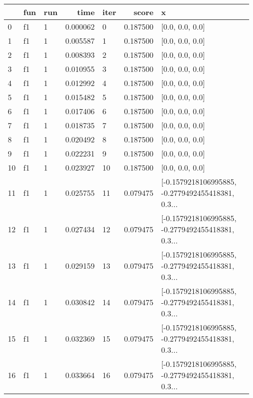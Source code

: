 \begin{tabular}{lllrlrl}
\toprule
{} & fun & run &      time & iter &     score &                                                  x \\
\midrule
0   &  f1 &   1 &  0.000062 &    0 &  0.187500 &                                    [0.0, 0.0, 0.0] \\
1   &  f1 &   1 &  0.005587 &    1 &  0.187500 &                                    [0.0, 0.0, 0.0] \\
2   &  f1 &   1 &  0.008393 &    2 &  0.187500 &                                    [0.0, 0.0, 0.0] \\
3   &  f1 &   1 &  0.010955 &    3 &  0.187500 &                                    [0.0, 0.0, 0.0] \\
4   &  f1 &   1 &  0.012992 &    4 &  0.187500 &                                    [0.0, 0.0, 0.0] \\
5   &  f1 &   1 &  0.015482 &    5 &  0.187500 &                                    [0.0, 0.0, 0.0] \\
6   &  f1 &   1 &  0.017406 &    6 &  0.187500 &                                    [0.0, 0.0, 0.0] \\
7   &  f1 &   1 &  0.018735 &    7 &  0.187500 &                                    [0.0, 0.0, 0.0] \\
8   &  f1 &   1 &  0.020492 &    8 &  0.187500 &                                    [0.0, 0.0, 0.0] \\
9   &  f1 &   1 &  0.022231 &    9 &  0.187500 &                                    [0.0, 0.0, 0.0] \\
10  &  f1 &   1 &  0.023927 &   10 &  0.187500 &                                    [0.0, 0.0, 0.0] \\
11  &  f1 &   1 &  0.025755 &   11 &  0.079475 &  [-0.1579218106995885, -0.2779492455418381, 0.3... \\
12  &  f1 &   1 &  0.027434 &   12 &  0.079475 &  [-0.1579218106995885, -0.2779492455418381, 0.3... \\
13  &  f1 &   1 &  0.029159 &   13 &  0.079475 &  [-0.1579218106995885, -0.2779492455418381, 0.3... \\
14  &  f1 &   1 &  0.030842 &   14 &  0.079475 &  [-0.1579218106995885, -0.2779492455418381, 0.3... \\
15  &  f1 &   1 &  0.032369 &   15 &  0.079475 &  [-0.1579218106995885, -0.2779492455418381, 0.3... \\
16  &  f1 &   1 &  0.033664 &   16 &  0.079475 &  [-0.1579218106995885, -0.2779492455418381, 0.3... \\

\end{tabular}
